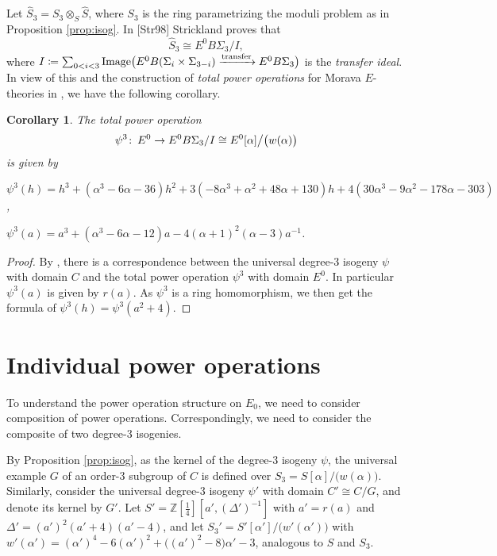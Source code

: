 \documentclass{gtpart}
\newtheorem{cor}[thm]{Corollary}
\theoremstyle{definition}
\theoremstyle{remark}
\def\co{\colon\thinspace}
\newcommand{\mb}[1]{\mathbb{#1}}
\newcommand{\BZ}{{\mb Z}}
\newcommand{\HS}{\widehat{S}}
\newcommand{\A}{\alpha}
\newcommand{\p}{\psi^3}
\begin{document}
Let $\HS_3 = S_3 \otimes_S \HS$, where $S_3$ is the ring parametrizing the moduli problem as in Proposition \ref{prop:isog}.  In [Str98] Strickland proves that 
\[
 \HS_3 \cong E^0 B\Sigma_3 / I, 
\]
where $I \coloneqq \sum_{0<i<3} {\rm Image} \big( E^0 B(\Sigma_i \times \Sigma_{3-i}) \xrightarrow{\rm transfer} E^0 B\Sigma_3 \big)$ is the {\em transfer ideal}.  
In view of this and the construction of {\em total power operations} for Morava $E$-theories in \cite[3.23]{cong}, we have the following corollary.  

\begin{cor}
\label{cor:psi3}
 The total power operation 
 \[
  \p \co E^0 \to E^0 B\Sigma_3 / I \cong E^0 [\A] \big/ \big( w(\A) \big) 
 \]
 is given by 
 
 $\p(h) = h^3 + (\A^3 - 6 \A - 36) h^2 + 3 (-8 \A^3 + \A^2 + 48 \A + 130) h + 4 (30 \A^3 - 9 \A^2 - 178 \A - 303)$, 
 
 $\p(a) = a^3 + (\A^3 - 6 \A - 12) a - 4 (\A + 1)^2 (\A - 3) a^{-1}$.  
 
\end{cor}
\begin{proof}
 By \cite[Theorem B]{cong}, there is a correspondence between the universal degree-3 isogeny $\psi$ with domain $C$ 
 and the total power operation $\p$ with domain $E^0$.  In particular $\p(a)$ is given by $r(a)$.  
 As $\p$ is a ring homomorphism, we then get the formula of $\p(h) = \p(a^2 + 4)$.  
\end{proof}


\section{Individual power operations}
\label{sec:Gamma}

To understand the power operation structure on $E_0$, 
we need to consider composition of power operations.  
Correspondingly, we need to consider the composite of two degree-3 isogenies.  

By Proposition \ref{prop:isog}, as the kernel of the degree-3 isogeny $\psi$, 
the universal example $G$ of an order-3 subgroup of $C$ is defined over 
$S_3 = S[\A] \big/ \big( w(\A) \big)$.  
Similarly, consider the universal degree-3 isogeny $\psi'$ with domain 
$C' \cong C/G$, and denote its kernel by $G'$.  
Let $S' = \BZ [\frac{1}{4}] [a', (\Delta')^{-1}]$ with $a' = r(a)$ and $\Delta' = (a')^2 (a' + 4) (a' - 4)$, 
and let $S_3' = S'[\A'] \big/ \big( w'(\A') \big)$ with $w'(\A') = (\A')^4 - 6 (\A')^2 + \big( (a')^2 - 8 \big) \A' - 3$, analogous to $S$ and $S_3$.  
\end{document}

